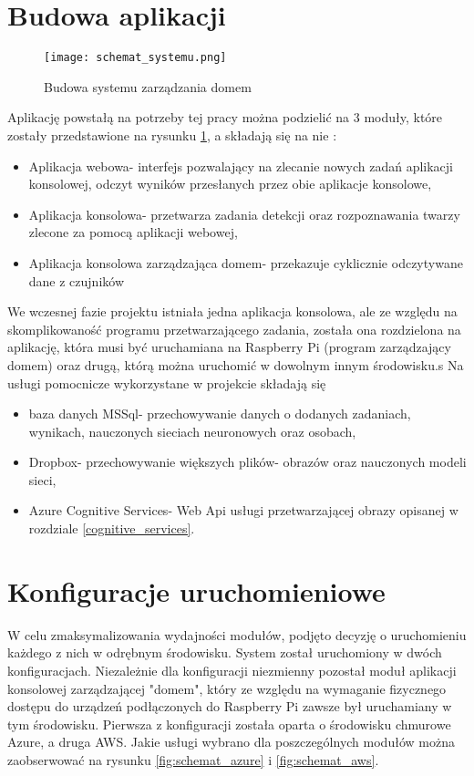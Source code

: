 \section{Budowa aplikacji}
\begin{figure}[H]
	\centering
	\texttt{[image: schemat\_systemu.png]}
	\caption{Budowa systemu zarządzania domem}
	\label{fig:schemat_systemu}
\end{figure}
Aplikację powstałą na potrzeby tej pracy można podzielić na 3 moduły, które zostały przedstawione na rysunku \ref{fig:schemat_systemu}, a składają się na nie :
\begin{itemize}
\item Aplikacja webowa- interfejs pozwalający na zlecanie nowych zadań aplikacji konsolowej, odczyt wyników przesłanych przez obie aplikacje konsolowe,
\item Aplikacja konsolowa- przetwarza zadania detekcji oraz rozpoznawania twarzy zlecone za pomocą aplikacji webowej,
\item Aplikacja konsolowa zarządzająca domem- przekazuje cyklicznie odczytywane dane z czujników %
\end{itemize}
We wczesnej fazie projektu istniała jedna aplikacja konsolowa, ale ze względu na skomplikowaność programu przetwarzającego zadania, została ona rozdzielona na aplikację, która musi być uruchamiana na Raspberry Pi (program zarządzający domem) oraz drugą, którą można uruchomić w dowolnym innym środowisku.s
Na usługi pomocnicze wykorzystane w projekcie składają się
\begin{itemize}
\item baza danych MSSql- przechowywanie danych o dodanych zadaniach, wynikach, nauczonych sieciach neuronowych oraz osobach,
\item Dropbox- przechowywanie większych plików- obrazów oraz nauczonych modeli sieci,
\item Azure Cognitive Services- Web Api usługi przetwarzającej obrazy opisanej w rozdziale \ref{cognitive_services}.
\end{itemize}

\section{Konfiguracje uruchomieniowe}
W celu zmaksymalizowania wydajności modułów, podjęto decyzję o uruchomieniu każdego z nich w odrębnym środowisku. System został uruchomiony w dwóch konfiguracjach. Niezależnie dla konfiguracji niezmienny pozostał moduł aplikacji konsolowej zarządzającej "domem", który ze względu na wymaganie fizycznego dostępu do urządzeń podłączonych do Raspberry Pi zawsze był uruchamiany w tym środowisku.
Pierwsza z konfiguracji została oparta o środowisku chmurowe Azure, a druga AWS. Jakie usługi wybrano dla poszczególnych modułów można zaobserwować na rysunku \ref{fig:schemat_azure} i \ref{fig:schemat_aws}.

